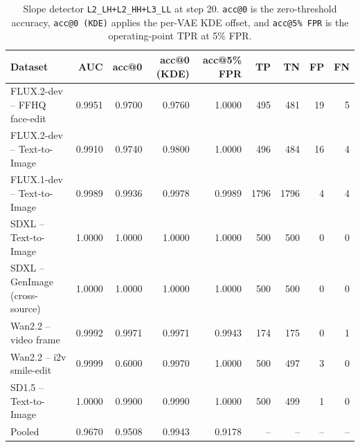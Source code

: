 \begin{table}[t]
\centering
\small
\setlength{\tabcolsep}{5pt}
\begin{tabular}{lrrrrrrrr}
\toprule
Dataset & AUC & acc@0 & acc@0 (KDE) & acc@5\% FPR & TP & TN & FP & FN \\
\midrule
FLUX.2-dev -- FFHQ face-edit          & 0.9951 & 0.9700 & 0.9760 & 1.0000 & 495 & 481 & 19 & 5 \\
FLUX.2-dev -- Text-to-Image           & 0.9910 & 0.9740 & 0.9800 & 1.0000 & 496 & 484 & 16 & 4 \\
FLUX.1-dev -- Text-to-Image           & 0.9989 & 0.9936 & 0.9978 & 0.9989 & 1796 & 1796 & 4 & 4 \\
SDXL -- Text-to-Image                 & 1.0000 & 1.0000 & 1.0000 & 1.0000 & 500 & 500 & 0 & 0 \\
SDXL -- GenImage (cross-source)       & 1.0000 & 1.0000 & 1.0000 & 1.0000 & 500 & 500 & 0 & 0 \\
Wan2.2 -- video frame                 & 0.9992 & 0.9971 & 0.9971 & 0.9943 & 174 & 175 & 0 & 1 \\
Wan2.2 -- i2v smile-edit              & 0.9999 & 0.6000 & 0.9970 & 1.0000 & 500 & 497 & 3 & 0 \\
SD1.5 -- Text-to-Image                & 1.0000 & 0.9900 & 0.9990 & 1.0000 & 500 & 499 & 1 & 0 \\
\midrule
Pooled                                & 0.9670 & 0.9508 & 0.9943 & 0.9178 & -- & -- & -- & -- \\
\bottomrule
\end{tabular}
\caption{Slope detector \texttt{L2\_LH+L2\_HH+L3\_LL} at step 20. \texttt{acc@0} is the zero-threshold accuracy, \texttt{acc@0 (KDE)} applies the per-VAE KDE offset, and \texttt{acc@5\% FPR} is the operating-point TPR at 5\% FPR.}
\end{table}

